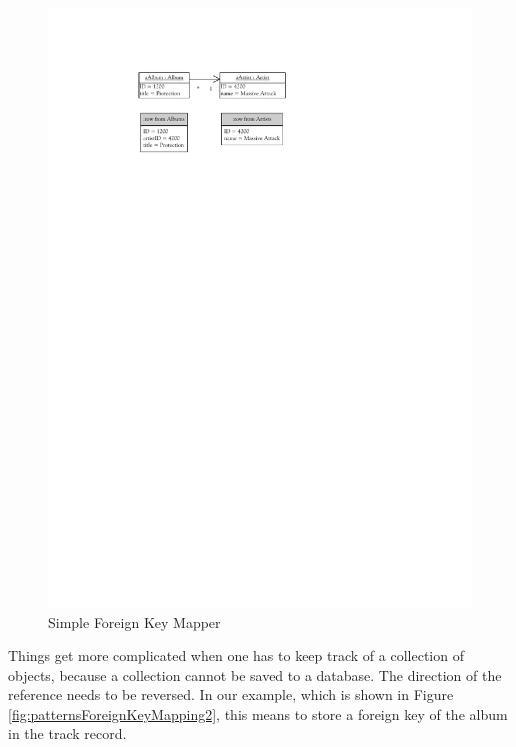 			\begin{figure}[htb]
				\begin{center}
					\includegraphics{./files/inc/figures/patternsForeignKeyMapping1}
					\caption{\label{fig:patternsForeignKeyMapping1} Simple Foreign Key Mapper}
				\end{center}
			\end{figure}
			Things get more complicated when one has to keep track of a collection of objects, because
			a collection cannot be saved to a database. The direction of the reference needs to be reversed.
			In our example, which is shown in Figure \ref{fig:patternsForeignKeyMapping2}, this means to
			store a foreign key of the album in the track record.

